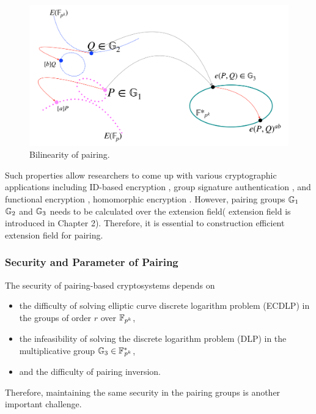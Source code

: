 \begin{figure}
	\centering
	\includegraphics[width=0.7\linewidth]{Figures/bilinearity}
	\caption{Bilinearity of pairing.}
	\label{fig:ch:intro:pairing}
\end{figure}

Such properties allow researchers to come up with various cryptographic applications including ID-based encryption \cite{C:BonFra01}, group signature authentication \cite{C:BonBoySha04}, and functional encryption \cite{C:OkaTak10}, homomorphic encryption \cite{EC:OkaUch98a,CCS:NacSte98,PAIRING:OkaTak08}. 
However, pairing groups ${\mathbb{G}}_{1}$ ${\mathbb{G}}_{2}$ and ${\mathbb{G}}_{3}$ needs to be calculated over the extension field( extension field is introduced in Chapter 2).
Therefore, it is essential to construction efficient extension field for pairing.

\subsubsection*{Security and Parameter of Pairing}
The security of pairing-based cryptosystems depends  on 
\begin{itemize}
	\item  the difficulty of solving elliptic curve discrete logarithm problem (ECDLP) in the groups of order $r$ over ${\mathbb{F}}_{p^{k}}$,
	\item  the infeasibility of solving the discrete logarithm problem (DLP) in the multiplicative group ${\mathbb{G}}_{3} \in {{\mathbb{F}}^{\ast}}_{\!\!\!p^{k}}$,
	\item and the difficulty of pairing inversion.
\end{itemize}
Therefore, maintaining the same security in the pairing groups is another important challenge.

